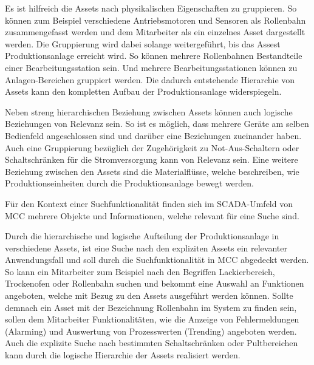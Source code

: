 \begin{description}
    Es ist hilfreich die Assets nach physikalischen Eigenschaften zu gruppieren. So können zum Beispiel verschiedene Antriebsmotoren und Sensoren als \glqq Rollenbahn\grqq{} zusammengefasst werden und dem Mitarbeiter als ein einzelnes Asset dargestellt werden. Die Gruppierung wird dabei solange weitergeführt, bis das Assest \glqq Produktionsanlage\grqq{} erreicht wird. So können mehrere \glqq Rollenbahnen\grqq{} Bestandteile einer \glqq Bearbeitungsstation\grqq{} sein. Und mehrere \glqq Bearbeitungsstationen\grqq{} können zu \glqq Anlagen-Bereichen\grqq{} gruppiert werden. Die dadurch entstehende Hierarchie von Assets kann den kompletten Aufbau der Produktionsanlage widerspiegeln.

    Neben streng hierarchischen Beziehung zwischen Assets können auch logische Beziehungen von Relevanz sein. So ist es möglich, dass mehrere Geräte am selben Bedienfeld angeschlossen sind und darüber eine Beziehungen zueinander haben. Auch eine Gruppierung bezüglich der Zugehörigkeit zu Not-Aus-Schaltern oder Schaltschränken für die Stromversorgung kann von Relevanz sein. Eine weitere Beziehung zwischen den Assets sind die Materialflüsse, welche beschreiben, wie Produktionseinheiten durch die Produktionsanlage bewegt werden.
    
\end{description}

Für den Kontext einer Suchfunktionalität finden sich im SCADA-Umfeld von MCC mehrere Objekte und Informationen, welche relevant für eine Suche sind.

Durch die hierarchische und logische Aufteilung der Produktionsanlage in verschiedene Assets, ist eine Suche nach den expliziten Assets ein relevanter Anwendungsfall und soll durch die Suchfunktionalität in MCC abgedeckt werden. So kann ein Mitarbeiter zum Beispiel nach den Begriffen \glqq Lackierbereich\grqq{}, \glqq Trockenofen\grqq{} oder \glqq Rollenbahn\grqq{} suchen und bekommt eine Auswahl an Funktionen angeboten, welche mit Bezug zu den Assets ausgeführt werden können. Sollte demnach ein Asset mit der Bezeichnung \glqq Rollenbahn\grqq{} im System zu finden sein, sollen dem Mitarbeiter Funktionalitäten, wie die Anzeige von Fehlermeldungen (Alarming) und Auswertung von Prozesswerten (Trending) angeboten werden. Auch die explizite Suche nach bestimmten Schaltschränken oder Pultbereichen kann durch die logische Hierarchie der Assets realisiert werden.

